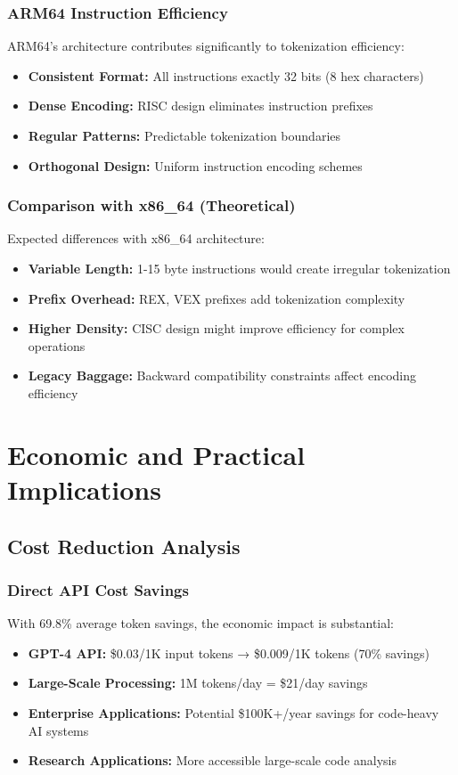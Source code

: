 \documentclass[11pt,a4paper]{article}
\begin{document}
\subsubsection{ARM64 Instruction Efficiency}
ARM64's architecture contributes significantly to tokenization efficiency:
\begin{itemize}
    \item \textbf{Consistent Format:} All instructions exactly 32 bits (8 hex characters)
    \item \textbf{Dense Encoding:} RISC design eliminates instruction prefixes
    \item \textbf{Regular Patterns:} Predictable tokenization boundaries
    \item \textbf{Orthogonal Design:} Uniform instruction encoding schemes
\end{itemize}

\subsubsection{Comparison with x86\_64 (Theoretical)}
Expected differences with x86\_64 architecture:
\begin{itemize}
    \item \textbf{Variable Length:} 1-15 byte instructions would create irregular tokenization
    \item \textbf{Prefix Overhead:} REX, VEX prefixes add tokenization complexity
    \item \textbf{Higher Density:} CISC design might improve efficiency for complex operations
    \item \textbf{Legacy Baggage:} Backward compatibility constraints affect encoding efficiency
\end{itemize}

\section{Economic and Practical Implications}

\subsection{Cost Reduction Analysis}
\subsubsection{Direct API Cost Savings}
With 69.8\% average token savings, the economic impact is substantial:
\begin{itemize}
    \item \textbf{GPT-4 API:} \$0.03/1K input tokens → \$0.009/1K tokens (70\% savings)
    \item \textbf{Large-Scale Processing:} 1M tokens/day = \$21/day savings  
    \item \textbf{Enterprise Applications:} Potential \$100K+/year savings for code-heavy AI systems
    \item \textbf{Research Applications:} More accessible large-scale code analysis
\end{itemize}
\end{document}
